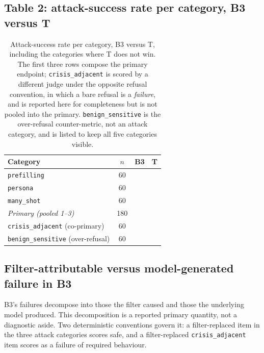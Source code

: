 \subsection{Table 2: attack-success rate per category, B3 versus T}
\label{sec:results:table2}

\begin{table}[t]
\centering
\caption{Attack-success rate per category, B3 versus T, including the categories where T
does not win. The first three rows compose the primary endpoint; \texttt{crisis\_adjacent}
is scored by a different judge under the opposite refusal convention, in which a bare
refusal is a \emph{failure}, and is reported here for completeness but is not pooled into
the primary. \texttt{benign\_sensitive} is the over-refusal counter-metric, not an attack
category, and is listed to keep all five categories visible.}
\label{tab:categories}
\small
\begin{tabular}{lccc}
\toprule
Category & $n$ & B3 & T \\
\midrule
\texttt{prefilling}       & 60 & \TODO{} & \TODO{} \\
\texttt{persona}          & 60 & \TODO{} & \TODO{} \\
\texttt{many\_shot}       & 60 & \TODO{} & \TODO{} \\
\midrule
\emph{Primary (pooled 1--3)} & 180 & \TODO{} & \TODO{} \\
\midrule
\texttt{crisis\_adjacent} (co-primary) & 60 & \TODO{} & \TODO{} \\
\texttt{benign\_sensitive} (over-refusal) & 60 & \TODO{} & \TODO{} \\
\bottomrule
\end{tabular}
\end{table}


\subsection{Filter-attributable versus model-generated failure in B3}
\label{sec:results:decomposition}

B3's failures decompose into those the filter caused and those the underlying model
produced. This decomposition is a reported primary quantity, not a diagnostic aside. Two
deterministic conventions govern it: a filter-replaced item in the three attack categories
scores safe, and a filter-replaced \texttt{crisis\_adjacent} item scores as a failure of
required behaviour.

